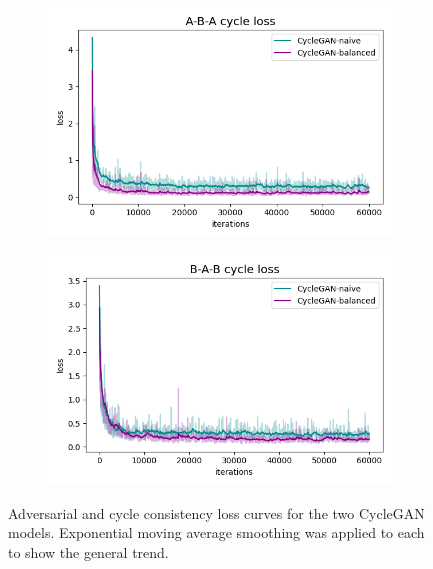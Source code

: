 \begin{figure}[h!]
    \begin{subfigure}{.5\textwidth}
        \centering
        \includegraphics[width=.95\linewidth]{figures/Expt_2/gan_convergence/loss_cycle_A.png}
        \caption{}
        \label{fig:loss_cycle_A}
    \end{subfigure}
    \begin{subfigure}{.5\textwidth}
        \centering
        \includegraphics[width=.95\linewidth]{figures/Expt_2/gan_convergence/loss_cycle_B.png}
        \caption{}
        \label{fig:loss_cycle_B}
    \end{subfigure}

    \caption{Adversarial and cycle consistency loss curves for the two CycleGAN models. Exponential moving average smoothing was applied to each to show the general trend.}
    \label{fig:cyclegan_losses}
\end{figure}{}

